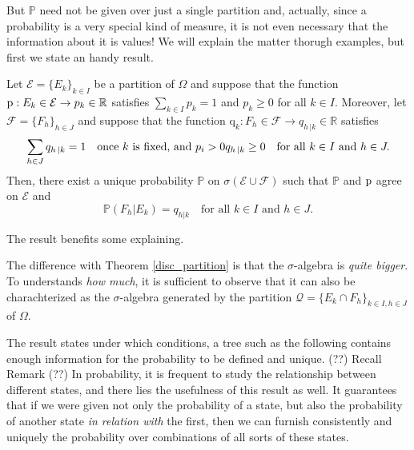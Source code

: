 But $\mathbb{P}$ need not be given over just a single partition and, actually, since a probability is a very special kind of measure, it is not even necessary that the information about it is values! We will explain the matter thorugh examples, but first we state an handy result.
\begin{my_corollary}
	\label{cond_partitions}
	Let $\mathcal{E}=\{ E_k \}_{k\in I}$ be a partition of $\Omega$ and suppose that the function $\mathrm{p}:E_k \in \mathcal{E} \to p_k \in \mathbb{R}$ satisfies $\sum_{k\in I} p_k=1$ and $p_k\geq0$ for all $k \in I$. Moreover, let $\mathcal{F}=\{ F_h \}_{h\in J}$ and suppose that the function $\mathrm{q}_k:F_h \in \mathcal{F} \to q_{h\,|k} \in \mathbb{R}$ satisfies
	\[
		\sum_{h \in J} q_{h\,|k}=1 \quad \text{once $k$ is fixed, and } p_i > 0
		\\
		q_{h\,|k}\geq0 \quad \text{for all } k \in I \text{ and } h \in J.
	\]
	Then, there exist a unique probability $\mathbb{P}$ on $\sigma(\mathcal{E}\cup\mathcal{F})$ such that $\mathbb{P}$ and $\mathrm{p}$ agree on $\mathcal{E}$ and
	\[
		\mathbb{P}\left( F_h | E_k \right) = q_{h|k} \quad \text{for all } k \in I \text{ and } h \in J.
	\]
\end{my_corollary}
The result benefits some explaining. 
\begin{my_remark}
	\label{real_part}
	The difference with Theorem \ref{disc_partition} is that the $\sigma$-algebra is \textit{quite bigger}. To understands \textit{how much}, it is sufficient to observe that it can also be charachterized as the $\sigma$-algebra generated by the partition $\mathcal{Q}=\{ E_k \cap F_h\}_{k\in I,h\in J}$ of $\Omega$. 
\end{my_remark}	
\begin{my_remark}
	\label{usefull_condpart}
	The result states under which conditions, a tree such as the following contains enough information for the probability to be defined and unique.
	(??)%
	Recall Remark 
	(??) %
	In probability, it is frequent to study the relationship between different states, and there lies the usefulness of this result as well. It guarantees that if we were given not only the probability of a state, but also the probability of another state \textit{in relation with} the first, then we can furnish consistently and uniquely the probability over combinations of all sorts of these states.
\end{my_remark}
\begin{my_example}
	
\end{my_example}
